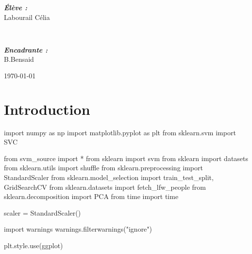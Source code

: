 \documentclass[
  12pt,
  letterpaper,
  DIV=11,
  numbers=noendperiod]{scrartcl}
\newenvironment{Shaded}{\begin{snugshade}}{\end{snugshade}}
\newcommand{\ImportTok}[1]{\textcolor[rgb]{0.00,0.46,0.62}{#1}}
\newcommand{\NormalTok}[1]{\textcolor[rgb]{0.00,0.23,0.31}{#1}}
\newcommand{\OperatorTok}[1]{\textcolor[rgb]{0.37,0.37,0.37}{#1}}
\newcommand{\StringTok}[1]{\textcolor[rgb]{0.13,0.47,0.30}{#1}}
\begin{document}
\begin{titlepage}
\begin{minipage}{0.5\textwidth}
\begin{flushleft} \large
\emph{\textbf{Élève :}}\\
Labourail Célia
\end{flushleft}
\end{minipage}
~
\begin{minipage}{0.4\textwidth}
\begin{flushright} \large
\emph{\textbf{Encadrante :}} \\
B.Bensaid
\end{flushright}
\end{minipage}

\vspace*{\fill}

\begin{center}
{\today}
\end{center}

\end{titlepage}

\section{Introduction}\label{introduction}

\begin{Shaded}
\begin{Highlighting}[]
\ImportTok{import}\NormalTok{ numpy }\ImportTok{as}\NormalTok{ np}
\ImportTok{import}\NormalTok{ matplotlib.pyplot }\ImportTok{as}\NormalTok{ plt}
\ImportTok{from}\NormalTok{ sklearn.svm }\ImportTok{import}\NormalTok{ SVC}

\ImportTok{from}\NormalTok{ svm\_source }\ImportTok{import} \OperatorTok{*}
\ImportTok{from}\NormalTok{ sklearn }\ImportTok{import}\NormalTok{ svm}
\ImportTok{from}\NormalTok{ sklearn }\ImportTok{import}\NormalTok{ datasets}
\ImportTok{from}\NormalTok{ sklearn.utils }\ImportTok{import}\NormalTok{ shuffle}
\ImportTok{from}\NormalTok{ sklearn.preprocessing }\ImportTok{import}\NormalTok{ StandardScaler}
\ImportTok{from}\NormalTok{ sklearn.model\_selection }\ImportTok{import}\NormalTok{ train\_test\_split, GridSearchCV}
\ImportTok{from}\NormalTok{ sklearn.datasets }\ImportTok{import}\NormalTok{ fetch\_lfw\_people}
\ImportTok{from}\NormalTok{ sklearn.decomposition }\ImportTok{import}\NormalTok{ PCA}
\ImportTok{from}\NormalTok{ time }\ImportTok{import}\NormalTok{ time}

\NormalTok{scaler }\OperatorTok{=}\NormalTok{ StandardScaler()}

\ImportTok{import}\NormalTok{ warnings}
\NormalTok{warnings.filterwarnings(}\StringTok{"ignore"}\NormalTok{)}

\NormalTok{plt.style.use(}\StringTok{\textquotesingle{}ggplot\textquotesingle{}}\NormalTok{)}
\end{Highlighting}
\end{Shaded}
\end{document}
